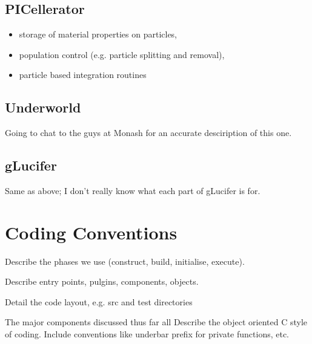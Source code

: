 \documentclass[a4paper,12pt]{article}
\begin{document}
\subsection{PICellerator}
\label{ov:pic}
\begin{itemize}
\item storage of material properties on particles, 
\item population control (e.g. particle splitting and removal), 
\item particle based integration routines
\end{itemize}

\subsection{Underworld}
\label{ov:underworld}
Going to chat to the guys at Monash for an accurate desciription of this one.

\subsection{gLucifer}
\label{ov:glu}
Same as above; I don't really know what each part of gLucifer is for.

\section{Coding Conventions}
\label{cc}
Describe the phases we use (construct, build, initialise, execute).

Describe entry points, pulgins, components, objects.

Detail the code layout, e.g. src and test directories

The major components discussed thus far all 
Describe the object oriented C style of coding. Include conventions like
underbar prefix for private functions, etc.
\end{document}
